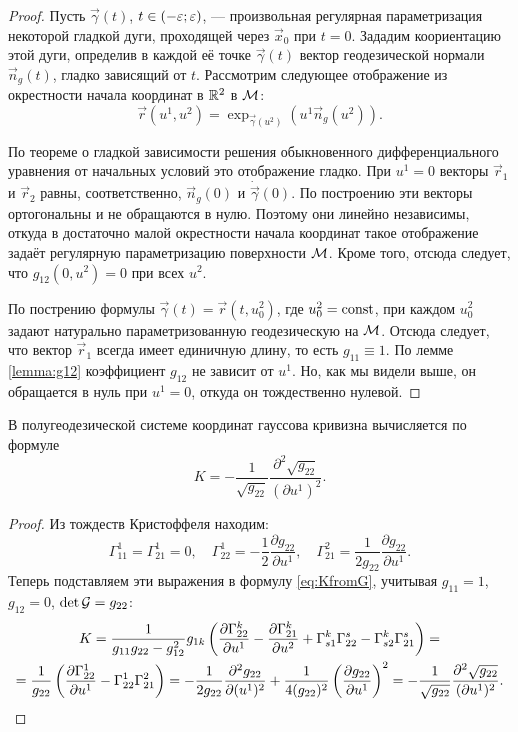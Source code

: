 \begin{proof}
	Пусть $\vec{\gamma}(t)$, $t \in (-\varepsilon; \varepsilon)$, --- произвольная регулярная параметризация некоторой гладкой дуги, проходящей через $\vec{x}_0$ при $t = 0$. Зададим коориентацию этой дуги, определив в каждой её точке $\vec{\gamma}(t)$ вектор геодезической нормали $\vec{n}_g(t)$, гладко зависящий от $t$. Рассмотрим следующее отображение из окрестности начала координат в $\mathbb{R}^2$ в $\mathcal{M}$:
	\[
		\vec{r}(u^1, u^2) = \exp_{\vec{\gamma}(u^2)}(u^1\vec{n}_g(u^2)).
	\]

	По теореме о гладкой зависимости решения обыкновенного дифференциального уравнения от начальных условий это отображение гладко. При $u^1 = 0$ векторы $\vec{r}_1$ и $\vec{r}_2$ равны, соответственно, $\vec{n}_g(0)$ и $\dot{\vec{\gamma}}(0)$. По построению эти векторы ортогональны и не обращаются в нулю. Поэтому они линейно независимы, откуда в достаточно малой окрестности начала координат такое отображение задаёт регулярную параметризацию поверхности $\mathcal{M}$. Кроме того, отсюда следует, что $g_{12}(0, u^2) = 0$ при всех $u^2$.

	По пострению формулы $\vec{\gamma}(t) = \vec{r}(t, u_0^2)$, где $u_0^2 = \mathrm{const}$, при каждом $u_0^2$ задают натурально параметризованную геодезическую на $\mathcal{M}$. Отсюда следует, что вектор $\vec{r}_1$ всегда имеет единичную длину, то есть $g_{11} \equiv 1$. По лемме \ref{lemma:g12} коэффициент $g_{12}$ не зависит от $u^1$. Но, как мы видели выше, он обращается в нуль при $u^1 = 0$, откуда он тождественно нулевой.
\end{proof}

\begin{lemma} \label{lemma:GeoK}
	В полугеодезической системе координат гауссова кривизна вычисляется по формуле
	\begin{equation} \label{eq:GeoK}
		K = -\frac{1}{\sqrt{g_{22}}}\frac{\partial^2\sqrt{g_{22}}}{(\partial u^1)^2}.
	\end{equation}
\end{lemma}

\begin{proof}
	Из тождеств Кристоффеля находим:
	\[
		\Gamma_{11}^1 = \Gamma_{21}^1 = 0,\quad\Gamma_{22}^1 = -\frac{1}{2}\frac{\partial g_{22}}{\partial u^1},\quad\Gamma_{21}^2 = \frac{1}{2g_{22}}\frac{\partial g_{22}}{\partial u^1}.
	\]
	Теперь подставляем эти выражения в формулу \eqref{eq:KfromG}, учитывая $g_{11} = 1$, $g_{12} = 0$, $\det\mathcal{G} = g_{22}$:
	\begin{multline*}
		K = \frac{1}{g_{11}g_{22} - g_{12}^2}g_{1k}\left(\frac{\partial\Gamma^k_{22}}{\partial u^1} - \frac{\partial\Gamma_{21}^k}{\partial u^2} + \Gamma_{s1}^k\Gamma^s_{22} - \Gamma_{s2}^k\Gamma_{21}^s\right) =\\ = \frac{1}{g_{22}}\left(\frac{\partial\Gamma_{22}^1}{\partial u^1} - \Gamma_{22}^1\Gamma_{21}^2\right) = -\frac{1}{2g_{22}}\frac{\partial^2g_{22}}{\partial (u^1)^2} + \frac{1}{4(g_{22})^2}\left(\frac{\partial g_{22}}{\partial u^1}\right)^2 = -\frac{1}{\sqrt{g_{22}}}\frac{\partial^2\sqrt{g_{22}}}{(\partial u^1)^2}.
	\end{multline*}
\end{proof}

